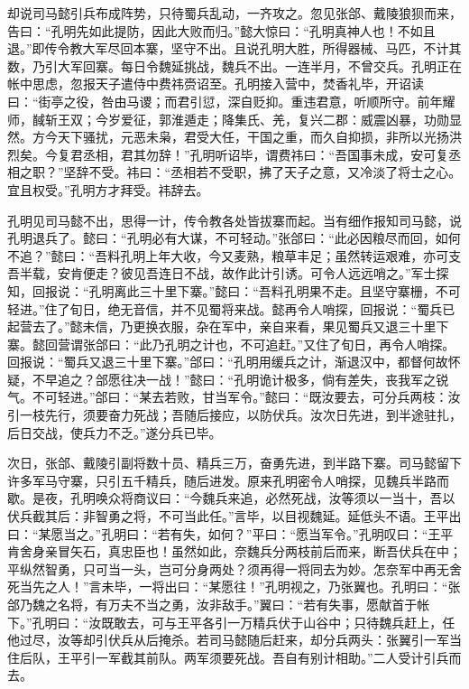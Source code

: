 却说司马懿引兵布成阵势，只待蜀兵乱动，一齐攻之。忽见张郃、戴陵狼狈而来，告曰：“孔明先如此提防，因此大败而归。”懿大惊曰：“孔明真神人也！不如且退。”即传令教大军尽回本寨，坚守不出。且说孔明大胜，所得器械、马匹，不计其数，乃引大军回寨。每日令魏延挑战，魏兵不出。一连半月，不曾交兵。孔明正在帐中思虑，忽报天子遣侍中费祎赍诏至。孔明接入营中，焚香礼毕，开诏读曰：“街亭之役，咎由马谡；而君引愆，深自贬抑。重违君意，听顺所守。前年耀师，馘斩王双；今岁爱征，郭淮遁走；降集氏、羌，复兴二郡：威震凶暴，功勋显然。方今天下骚扰，元恶未枭，君受大任，干国之重，而久自抑损，非所以光扬洪烈矣。今复君丞相，君其勿辞！”孔明听诏毕，谓费祎曰：“吾国事未成，安可复丞相之职？”坚辞不受。祎曰：“丞相若不受职，拂了天子之意，又冷淡了将士之心。宜且权受。”孔明方才拜受。祎辞去。

孔明见司马懿不出，思得一计，传令教各处皆拔寨而起。当有细作报知司马懿，说孔明退兵了。懿曰：“孔明必有大谋，不可轻动。”张郃曰：“此必因粮尽而回，如何不追？”懿曰：“吾料孔明上年大收，今又麦熟，粮草丰足；虽然转运艰难，亦可支吾半载，安肯便走？彼见吾连日不战，故作此计引诱。可令人远远哨之。”军士探知，回报说：“孔明离此三十里下寨。”懿曰：“吾料孔明果不走。且坚守寨栅，不可轻进。”住了旬日，绝无音信，并不见蜀将来战。懿再令人哨探，回报说：“蜀兵已起营去了。”懿未信，乃更换衣服，杂在军中，亲自来看，果见蜀兵又退三十里下寨。懿回营谓张郃曰：“此乃孔明之计也，不可追赶。”又住了旬日，再令人哨探。回报说：“蜀兵又退三十里下寨。”郃曰：“孔明用缓兵之计，渐退汉中，都督何故怀疑，不早追之？郃愿往决一战！”懿曰：“孔明诡计极多，倘有差失，丧我军之锐气。不可轻进。”郃曰：“某去若败，甘当军令。”懿曰：“既汝要去，可分兵两枝：汝引一枝先行，须要奋力死战；吾随后接应，以防伏兵。汝次日先进，到半途驻扎，后日交战，使兵力不乏。”遂分兵已毕。

次日，张郃、戴陵引副将数十员、精兵三万，奋勇先进，到半路下寨。司马懿留下许多军马守寨，只引五千精兵，随后进发。原来孔明密令人哨探，见魏兵半路而歇。是夜，孔明唤众将商议曰：“今魏兵来追，必然死战，汝等须以一当十，吾以伏兵截其后：非智勇之将，不可当此任。”言毕，以目视魏延。延低头不语。王平出曰：“某愿当之。”孔明曰：“若有失，如何？”平曰：“愿当军令。”孔明叹曰：“王平肯舍身亲冒矢石，真忠臣也！虽然如此，奈魏兵分两枝前后而来，断吾伏兵在中；平纵然智勇，只可当一头，岂可分身两处？须再得一将同去为妙。怎奈军中再无舍死当先之人！”言未毕，一将出曰：“某愿往！”孔明视之，乃张翼也。孔明曰：“张郃乃魏之名将，有万夫不当之勇，汝非敌手。”翼曰：“若有失事，愿献首于帐下。”孔明曰：“汝既敢去，可与王平各引一万精兵伏于山谷中；只待魏兵赶上，任他过尽，汝等却引伏兵从后掩杀。若司马懿随后赶来，却分兵两头：张翼引一军当住后队，王平引一军截其前队。两军须要死战。吾自有别计相助。”二人受计引兵而去。

